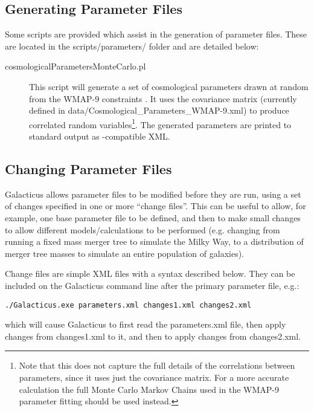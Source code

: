 \subsection{Generating Parameter Files}

Some scripts are provided which assist in the generation of parameter files. These are located in the {\normalfont \ttfamily scripts/parameters/} folder and are detailed below:
\begin{description}
\item [{\normalfont \ttfamily cosmologicalParametersMonteCarlo.pl}] This script will generate a set of cosmological parameters drawn at random from the WMAP-9 constraints \citep{hinshaw_nine-year_2012}. It uses the covariance matrix (currently defined in {\normalfont \ttfamily data/Cosmological\_Parameters\_WMAP-9.xml}) to produce correlated random variables\footnote{Note that this does not capture the full details of the correlations between parameters, since it uses just the covariance matrix. For a more accurate calculation the full Monte Carlo Markov Chains used in the WMAP-9 parameter fitting should be used instead.}. The generated parameters are printed to standard output as \glc-compatible XML.
\end{description}

\subsection{Changing Parameter Files}

Galacticus allows parameter files to be modified before they are run, using a set of changes specified in one or more ``change files''. This can be useful to allow, for example, one base parameter file to be defined, and then to make small changes to allow different models/calculations to be performed (e.g. changing from running a fixed mass merger tree to simulate the Milky Way, to a distribution of merger tree masses to simulate an entire population of galaxies).

Change files are simple XML files with a syntax described below. They can be included on the Galacticus command line after the primary parameter file, e.g.:
\begin{verbatim}
./Galacticus.exe parameters.xml changes1.xml changes2.xml
\end{verbatim}
which will cause Galacticus to first read the {\normalfont \ttfamily parameters.xml} file, then apply changes from {\normalfont \ttfamily changes1.xml} to it, and then to apply changes from {\normalfont \ttfamily changes2.xml}.

